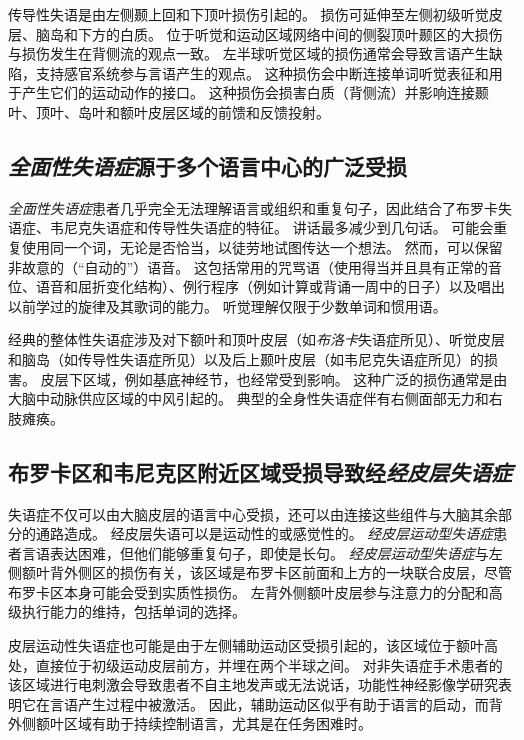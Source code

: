 传导性失语是由左侧颞上回和下顶叶损伤引起的。
损伤可延伸至左侧初级听觉皮层、脑岛和下方的白质。
位于听觉和运动区域网络中间的侧裂顶叶颞区的大损伤与损伤发生在背侧流的观点一致。
左半球听觉区域的损伤通常会导致言语产生缺陷，支持感官系统参与言语产生的观点。
这种损伤会中断连接单词听觉表征和用于产生它们的运动动作的接口。
这种损伤会损害白质（背侧流）并影响连接颞叶、顶叶、岛叶和额叶皮层区域的前馈和反馈投射。



\subsection{\textit{全面性失语症}源于多个语言中心的广泛受损}

\textit{全面性失语症}患者几乎完全无法理解语言或组织和重复句子，因此结合了布罗卡失语症、韦尼克失语症和传导性失语症的特征。
讲话最多减少到几句话。
可能会重复使用同一个词，无论是否恰当，以徒劳地试图传达一个想法。
然而，可以保留非故意的（“自动的”）语音。
这包括常用的咒骂语（使用得当并且具有正常的音位、语音和屈折变化结构）、例行程序（例如计算或背诵一周中的日子）以及唱出以前学过的旋律及其歌词的能力。
听觉理解仅限于少数单词和惯用语。


经典的整体性失语症涉及对下额叶和顶叶皮层（如\textit{布洛卡}失语症所见）、听觉皮层和脑岛（如传导性失语症所见）以及后上颞叶皮层（如韦尼克失语症所见）的损害。
皮层下区域，例如基底神经节，也经常受到影响。
这种广泛的损伤通常是由大脑中动脉供应区域的中风引起的。
典型的全身性失语症伴有右侧面部无力和右肢瘫痪。



\subsection{布罗卡区和韦尼克区附近区域受损导致经\textit{经皮层失语症}}

失语症不仅可以由大脑皮层的语言中心受损，还可以由连接这些组件与大脑其余部分的通路造成。
经皮层失语可以是运动性的或感觉性的。
\textit{经皮层运动型失语症}患者言语表达困难，但他们能够重复句子，即使是长句。
\textit{经皮层运动型失语症}与左侧额叶背外侧区的损伤有关，该区域是布罗卡区前面和上方的一块联合皮层，尽管布罗卡区本身可能会受到实质性损伤。
左背外侧额叶皮层参与注意力的分配和高级执行能力的维持，包括单词的选择。


皮层运动性失语症也可能是由于左侧辅助运动区受损引起的，该区域位于额叶高处，直接位于初级运动皮层前方，并埋在两个半球之间。
对非失语症手术患者的该区域进行电刺激会导致患者不自主地发声或无法说话，功能性神经影像学研究表明它在言语产生过程中被激活。
因此，辅助运动区似乎有助于语言的启动，而背外侧额叶区域有助于持续控制语言，尤其是在任务困难时。


